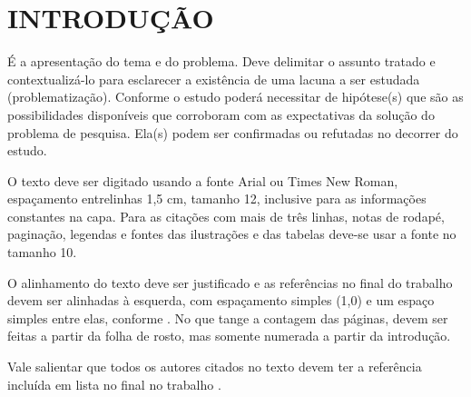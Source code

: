 \pagestyle{plain}
\setcounter{page}{9} %

\section{INTRODUÇÃO}
É a apresentação do tema e do problema. Deve delimitar o assunto tratado e contextualizá-lo para esclarecer a existência de uma lacuna a ser estudada (problematização). Conforme \textcite[p. 5]{reis_frota} o estudo poderá necessitar de hipótese(s) que são as possibilidades disponíveis que corroboram com as expectativas da solução do problema de pesquisa. Ela(s) podem ser confirmadas ou refutadas no decorrer do estudo.

O texto deve ser digitado usando a fonte Arial ou Times New Roman, espaçamento entrelinhas 1,5 cm, tamanho 12, inclusive para as informações constantes na capa. Para as citações com mais de três linhas, notas de rodapé, paginação, legendas e fontes das ilustrações e das tabelas deve-se usar a fonte no tamanho 10.

O alinhamento do texto deve ser justificado e as referências no final do trabalho devem ser alinhadas à esquerda, com espaçamento simples (1,0) e um espaço simples entre elas, conforme \textcite{abnt6023}. No que tange a contagem das páginas, devem ser feitas a partir da folha de rosto, mas somente numerada a partir da introdução.

Vale salientar que todos os autores citados no texto devem ter a referência incluída em lista no final no trabalho \cite{abnt14724}.
